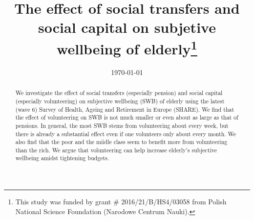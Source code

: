 \documentclass[10pt, letterpaper]{article}
\date{{}\today}
\title{  
The effect of social transfers and social capital on subjetive wellbeing of
elderly\footnote{This study was funded by grant \# 2016/21/B/HS4/03058 from
  Polish National Science Foundation (Narodowe Centrum Nauki).}
}
\author{
}
\begin{document}

%
\maketitle
\vspace{-.4in}
\begin{center}

\end{center}


\begin{abstract}
\noindent We investigate the effect of social transfers (especially pension) and
social capital (especially volunteering) on subjective wellbeing (SWB) of elderly using the latest (wave 6) Survey of Health, Ageing and Retirement in Europe
(SHARE). We find that the effect of volunteering on SWB is not much smaller or
even about as large as that of pensions. In general, the most SWB stems from volunteering about
every week, but there is already a substantial effect even if one volunteers only
about every month. We also find that the poor and the miidle
class seem to benefit more from volunteering than the rich.
We argue that volunteering can help increase elderly's subjective wellbeing amidst tightening budgets.
\end{abstract}
\vspace{.15in} 
\vspace{.25in} 
\end{document}
